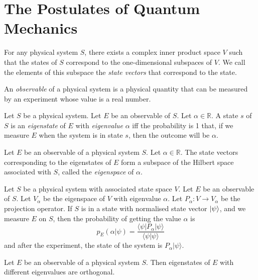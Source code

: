 \chapter{The Postulates of Quantum Mechanics}

\begin{ax}
For any physical system $S$, there exists a complex inner product space $V$ such that the states of $S$ correspond to the one-dimensional subspaces of $V$. We call the elements of this subspace the \emph{state vectors} that correspond to the state.
\end{ax}

\begin{df}[Observable]
An \emph{observable} of a physical system is a physical quantity that can be measured by an experiment whose value is a real number.
\end{df}

\begin{df}[Eigenstate]
Let $S$ be a physical system. Let $E$ be an observable of $S$. Let $\alpha \in \mathbb{R}$. A state $s$ of $S$ is
an \emph{eigenstate} of $E$ with \emph{eigenvalue} $\alpha$ iff the probability is 1 that, if we measure $E$ when the system is in state $s$, then the outcome will be $\alpha$.
\end{df}

\begin{ax}
Let $E$ be an observable of a physical system $S$. Let $\alpha \in \mathbb{R}$. The state vectors corresponding to the eigenstates of $E$ form a subspace of the Hilbert space associated with $S$, called the \emph{eigenspace} of $\alpha$.
\end{ax}

\begin{ax}
Let $S$ be a physical system with associated state space $V$. Let $E$ be an observable of $S$. Let $V_\alpha$ be the eigenspace of $V$ with eigenvalue $\alpha$. Let $P_\alpha : V \rightarrow V_\alpha$ be the projection operator. If $S$ is in a state with normalised state vector $\left| {\psi} \right\rangle$, and we measure $E$ on $S$, then the probability of getting the value $\alpha$ is
\[ p_E(\alpha | \psi) = \frac{\langle \psi | P_\alpha | \psi \rangle}{\langle \psi | \psi \rangle} \]
and after the experiment, the state of the system is $P_\alpha | \psi \rangle$.
\end{ax}

\begin{prop}
\label{prop:eigenstates_orthogonal}
Let $E$ be an observable of a physical system $S$. Then eigenstates of $E$ with different eigenvalues are orthogonal.
\end{prop}

